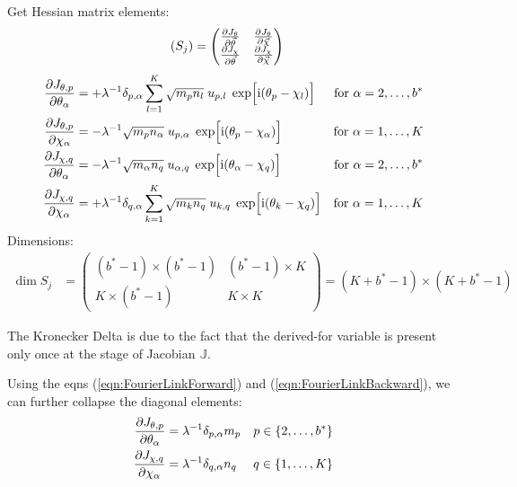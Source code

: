 \documentclass[
	english,
	a4paper,
	fontsize=10pt,
	parskip=half,
	titlepage=true,
	DIV=12,
	final
]{scrreprt}
\newcommand*{\iunit}{\ensuremath{\mathrm{i}}}
\begin{document}
Get Hessian matrix elements:
\begin{align}
	\qty( S_j )
&=
	\begin{pmatrix}
		\pdv{J_{\theta}}{\vec{\theta}} &
		\pdv{J_{\theta}}{\vec{\chi  }} 
		\\
		\pdv{J_{\chi  }}{\vec{\theta}} &
		\pdv{J_{\chi  }}{\vec{\chi  }} 
	\end{pmatrix}
\end{align}
\begin{align}
	\pdv{J_{\theta, p}}{\theta_{\alpha}}
&=
	+
	\lambda^{-1}
	\delta_{p,\alpha}
	\sum_{l=1}^{K}
		\sqrt{m_p n_l} \; u_{p,l} \; \exp[\Big. \iunit(\theta_p - \chi_l)]
&\text{for } \alpha = 2, \ldots, b^*
\\
	\pdv{J_{\theta, p}}{\chi_{\alpha}}
&=
	-
	\lambda^{-1}
	\sqrt{m_p n_\alpha} \; u_{p,\alpha} \; \exp[\Big. \iunit(\theta_p - \chi_\alpha)]
&\text{for } \alpha = 1, \ldots, K
\\
	\pdv{J_{\chi, q}}{\theta_{\alpha}}
&=
	-
	\lambda^{-1}
	\sqrt{m_\alpha n_q} \; u_{\alpha,q} \; \exp[\Big. \iunit(\theta_\alpha - \chi_q)]
&\text{for } \alpha = 2, \ldots, b^*
\\
	\pdv{J_{\chi, q}}{\chi_{\alpha}}
&=
	+
	\lambda^{-1}
	\delta_{q,\alpha}
	\sum_{k=1}^{K}
		\sqrt{m_k n_q} \; u_{k,q} \; \exp[\Big. \iunit(\theta_k - \chi_q)]
&\text{for } \alpha = 1, \ldots, K
\end{align}
Dimensions:
\begin{align}
	\dim S_j
&=
	\begin{pmatrix}
		(b^* - 1) \times (b^* - 1)	& (b^* - 1) \times K \\
		K \times (b^* - 1)			& K \times K
	\end{pmatrix}
=
	(K + b^* - 1) \times (K + b^* - 1)
\end{align}

The Kronecker Delta is due to the fact that the derived-for variable is present only once at the stage of Jacobian $\mathbb{J}$.

Using the eqns (\ref{eqn:FourierLinkForward}) and (\ref{eqn:FourierLinkBackward}), we can further collapse the diagonal elements:
\begin{align}
	\pdv{J_{\theta, p}}{\theta_{\alpha}}
&=
	\lambda^{-1}
	\delta_{p,\alpha}
	m_p
&
	p \in \{2, \ldots, b^*\}
\\
	\pdv{J_{\chi, q}}{\chi_{\alpha}}
&=
	\lambda^{-1}
	\delta_{q,\alpha}
	n_q
&
	q \in \{1, \ldots, K\}
\end{align}
\end{document}
